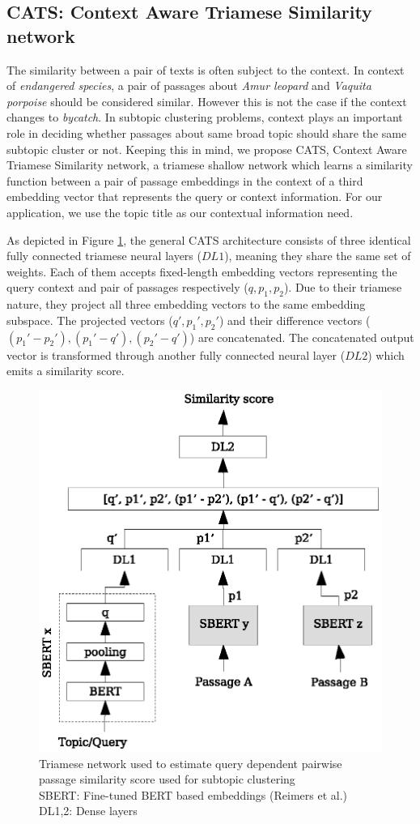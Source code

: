 \subsection{CATS: Context Aware Triamese Similarity network}\label{sec:cats} 
The similarity between a pair of texts is often subject to the context. In context of \textit{endangered species}, a pair of passages about \textit{Amur leopard} and \textit{Vaquita porpoise} should be considered similar. However this is not the case if the context changes to \textit{bycatch}. In subtopic clustering problems, context plays an important role in deciding whether passages about same broad topic should share the same subtopic cluster or not. Keeping this in mind, we propose CATS, Context Aware Triamese Similarity network, a triamese shallow network which learns a similarity function between a pair of passage embeddings in the context of a third embedding vector that represents the query or context information. For our application, we use the topic title as our contextual information need.

As depicted in Figure \ref{fig:triam}, the general CATS architecture consists of three identical fully connected triamese neural layers ($DL1$), meaning they share the same set of weights. Each of them accepts fixed-length embedding vectors representing the query context and pair of passages respectively ($q,p_1,p_2$). Due to their triamese nature, they project all three embedding vectors to the same embedding subspace. The projected vectors ($q',p_1',p_2'$) and their difference vectors ($(p_1'-p_2'),(p_1'-q'),(p_2'-q')$) are concatenated. The concatenated output vector is transformed through another fully connected neural layer ($DL2$) which emits a similarity score.
\begin{figure}[h]
  \centering
  \includegraphics[width=0.8\linewidth]{graphics/triamese.eps}
  \caption{Triamese network used to estimate query dependent pairwise passage similarity score used for subtopic clustering \\
  SBERT: Fine-tuned BERT based embeddings (Reimers et al.) \\
  DL1,2: Dense layers}
  \label{fig:triam}
\end{figure}

